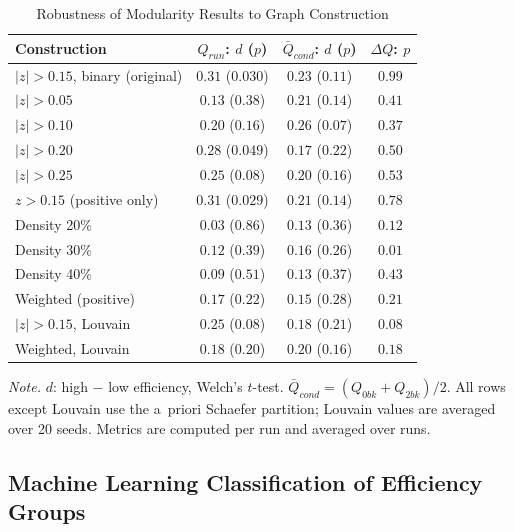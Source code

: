 \documentclass[conference]{IEEEtran}
\begin{document}
\begin{table}[t]
\caption{Robustness of Modularity Results to Graph Construction}
\label{tab:robust}
\centering
\footnotesize
\setlength{\tabcolsep}{3pt}
\begin{tabular}{@{}l c c c@{}}
\toprule
\textbf{Construction} & \textbf{$Q_{run}$: $d$ ($p$)} & \textbf{$\bar{Q}_{cond}$: $d$ ($p$)} & \textbf{$\Delta Q$: $p$} \\
\midrule
$|z|>0.15$, binary (original) & $0.31$ ($0.030$) & $0.23$ ($0.11$) & $0.99$ \\
$|z|>0.05$                    & $0.13$ ($0.38$)  & $0.21$ ($0.14$) & $0.41$ \\
$|z|>0.10$                    & $0.20$ ($0.16$)  & $0.26$ ($0.07$) & $0.37$ \\
$|z|>0.20$                    & $0.28$ ($0.049$) & $0.17$ ($0.22$) & $0.50$ \\
$|z|>0.25$                    & $0.25$ ($0.08$)  & $0.20$ ($0.16$) & $0.53$ \\
$z>0.15$ (positive only)      & $0.31$ ($0.029$) & $0.21$ ($0.14$) & $0.78$ \\
Density 20\%                  & $0.03$ ($0.86$)  & $0.13$ ($0.36$) & $0.12$ \\
Density 30\%                  & $0.12$ ($0.39$)  & $0.16$ ($0.26$) & $0.01$ \\
Density 40\%                  & $0.09$ ($0.51$)  & $0.13$ ($0.37$) & $0.43$ \\
Weighted (positive)           & $0.17$ ($0.22$)  & $0.15$ ($0.28$) & $0.21$ \\
$|z|>0.15$, Louvain           & $0.25$ ($0.08$)  & $0.18$ ($0.21$) & $0.08$ \\
Weighted, Louvain             & $0.18$ ($0.20$)  & $0.20$ ($0.16$) & $0.18$ \\
\bottomrule
\end{tabular}
\vspace{0.2em}

\scriptsize \textit{Note.} $d$: high $-$ low efficiency, Welch's $t$-test. $\bar{Q}_{cond}=(Q_{0bk}+Q_{2bk})/2$. All rows except Louvain use the a~priori Schaefer partition; Louvain values are averaged over 20 seeds. Metrics are computed per run and averaged over runs.
\end{table}

\subsection{Machine Learning Classification of Efficiency Groups}
\label{sec:ml}
\end{document}
